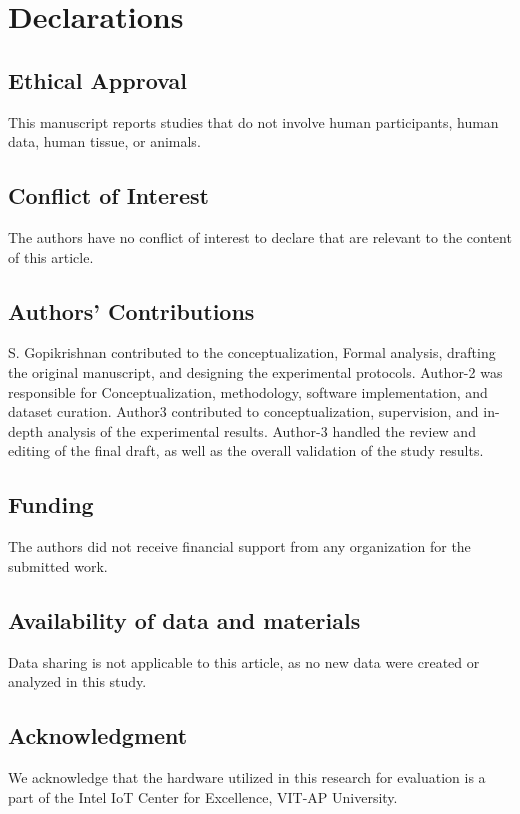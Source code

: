 \documentclass[a4paper,fleqn]{cas-dc}
\numberwithin{equation}{section}
\begin{document}
\section*{Declarations}
\subsection*{Ethical Approval}
This manuscript reports studies that do not involve human participants, human data, human tissue, or animals.

\subsection*{Conflict of Interest}
The authors have no conflict of interest to declare that are relevant to the content of this article.

\subsection*{Authors' Contributions}
S. Gopikrishnan contributed to the conceptualization, Formal analysis, drafting the original manuscript, and designing the experimental protocols. Author-2 was responsible for Conceptualization, methodology, software implementation, and dataset curation. Author3 contributed to conceptualization, supervision, and in-depth analysis of the experimental results. Author-3 handled the review and editing of the final draft, as well as the overall validation of the study results.

\subsection*{Funding}
The authors did not receive financial support from any organization for the submitted work.

\subsection*{Availability of data and materials}
Data sharing is not applicable to this article, as no new data were created or analyzed in this study.

\subsection*{Acknowledgment}
We acknowledge that the hardware utilized in this research for evaluation is a part of the Intel IoT Center for Excellence, VIT-AP University. 



\end{document}
